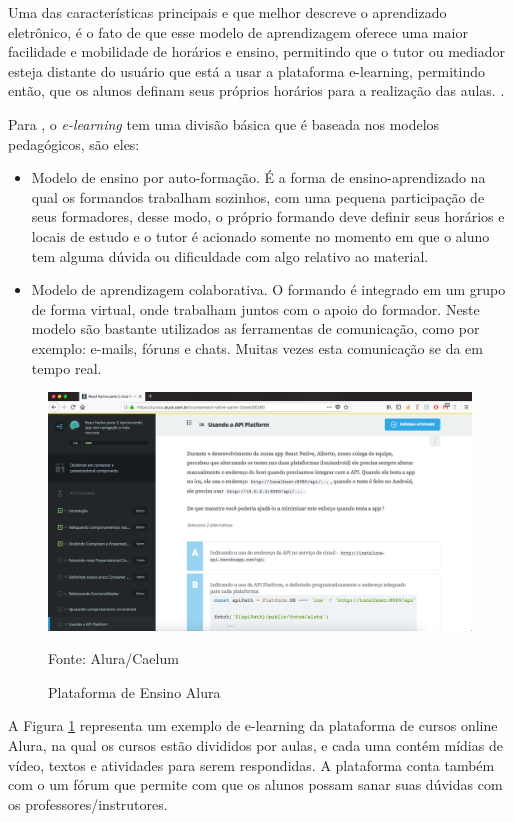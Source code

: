 	Uma das características principais e que melhor descreve o aprendizado eletrônico, é o fato  de  que esse modelo de aprendizagem oferece uma maior facilidade e mobilidade de horários e ensino, permitindo que o tutor ou mediador esteja distante do usuário que está a usar a plataforma e-learning, permitindo então, que os alunos definam seus próprios horários para a realização das aulas. \cite{caccao2003introduccao}.
	
	Para , o \textit{e-learning } tem uma divisão básica que é baseada nos modelos pedagógicos, são eles:
	\begin{itemize}
		\item Modelo de ensino por auto-formação. É a forma de ensino-aprendizado na qual os formandos trabalham sozinhos, com uma pequena participação de seus formadores, desse modo, o próprio formando deve definir seus horários e locais de estudo e o tutor é acionado somente no momento em que o aluno tem alguma dúvida ou dificuldade com algo relativo ao material.
		
		\item Modelo de aprendizagem colaborativa. O formando é integrado em um grupo de forma virtual, onde trabalham juntos com o apoio do formador. Neste modelo são bastante utilizados as ferramentas de comunicação, como por exemplo: e-mails, fóruns e chats. Muitas vezes esta comunicação se da em tempo real.
	\end{itemize}
	
	\begin{figure}[H]
		\centering
		\includegraphics[width=0.6\linewidth]{img/elearningAlura}
		\caption{Plataforma de Ensino Alura}
		Fonte: Alura/Caelum
		\label{aluracaelum}
	\end{figure}

	A Figura \ref{aluracaelum} representa um exemplo de e-learning da plataforma de cursos online Alura, na qual os cursos estão divididos por aulas, e cada uma contém mídias de vídeo, textos e atividades para serem respondidas. A plataforma conta também com o um fórum que permite com que os alunos possam sanar suas dúvidas com os professores/instrutores.
	
